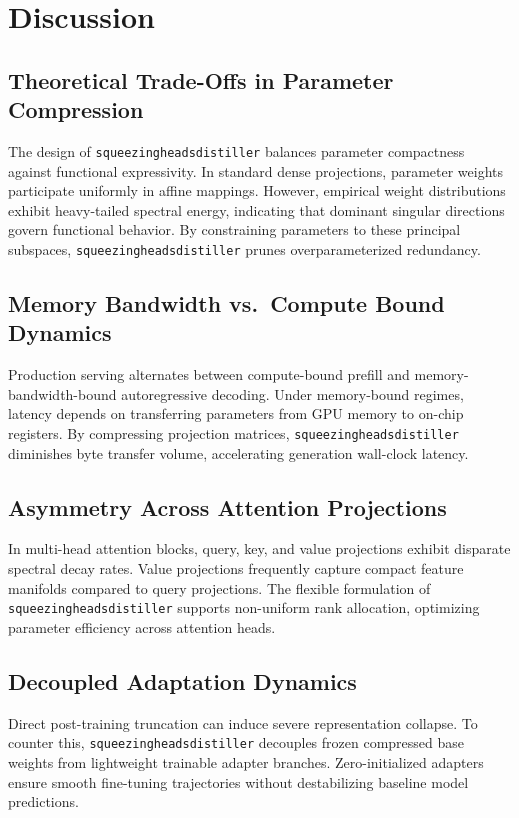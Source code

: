 \section{Discussion}

\subsection{Theoretical Trade-Offs in Parameter Compression}
The design of \texttt{squeezingheadsdistiller} balances parameter compactness against functional expressivity. In standard dense projections, parameter weights participate uniformly in affine mappings. However, empirical weight distributions exhibit heavy-tailed spectral energy, indicating that dominant singular directions govern functional behavior. By constraining parameters to these principal subspaces, \texttt{squeezingheadsdistiller} prunes overparameterized redundancy.

\subsection{Memory Bandwidth vs.\ Compute Bound Dynamics}
Production serving alternates between compute-bound prefill and memory-bandwidth-bound autoregressive decoding. Under memory-bound regimes, latency depends on transferring parameters from GPU memory to on-chip registers. By compressing projection matrices, \texttt{squeezingheadsdistiller} diminishes byte transfer volume, accelerating generation wall-clock latency.

\subsection{Asymmetry Across Attention Projections}
In multi-head attention blocks, query, key, and value projections exhibit disparate spectral decay rates. Value projections frequently capture compact feature manifolds compared to query projections. The flexible formulation of \texttt{squeezingheadsdistiller} supports non-uniform rank allocation, optimizing parameter efficiency across attention heads.

\subsection{Decoupled Adaptation Dynamics}
Direct post-training truncation can induce severe representation collapse. To counter this, \texttt{squeezingheadsdistiller} decouples frozen compressed base weights from lightweight trainable adapter branches. Zero-initialized adapters ensure smooth fine-tuning trajectories without destabilizing baseline model predictions.

